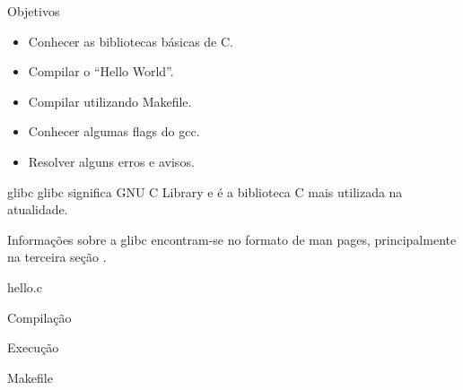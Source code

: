 \documentclass{beamer}
\begin{document}
\newcommand{\software}{\emph{software}\xspace}
\newcommand{\Software}{\emph{Software}\xspace}
\newcommand{\softwarelivre}{\Software Livre\xspace}
\newcommand{\opensource}{\emph{Open-Source}\xspace}

\begin{frame}{Objetivos}
  \begin{itemize}
    \item Conhecer as bibliotecas básicas de C.
    \item Compilar o ``Hello World''.
    \item Compilar utilizando Makefile.
    \item Conhecer algumas flags do gcc.
    \item Resolver alguns erros e avisos.
  \end{itemize}
\end{frame}


\begin{frame}{glibc}
  glibc significa GNU C Library e é a biblioteca C mais utilizada na
  atualidade.

  Informações sobre a glibc encontram-se no formato de man pages,
  principalmente na terceira seção .

  \begin{center}
    \begin{shell}
    \end{shell}
  \end{center}
\end{frame}

\begin{frame}[fragile]{hello.c}
  
\end{frame}

\begin{frame}{Compilação}
  \begin{center}
    \begin{shell}
    \end{shell}
  \end{center}
\end{frame}

\begin{frame}{Execução}
  \begin{center}
    \begin{shell}
    \end{shell}
  \end{center}
\end{frame}

\begin{frame}[fragile]{Makefile}
  
\end{frame}
\end{document}
